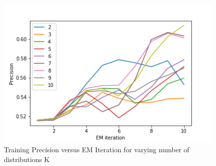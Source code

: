 \documentclass[11pt]{article}
\begin{document}
	\begin{figure}[H]
	
	\includegraphics[width=\textwidth, keepaspectratio]{Precision.png}
	
	\caption{Training Precision versus EM Iteration for varying number of distributions K}
\end{figure}
\end{document}
